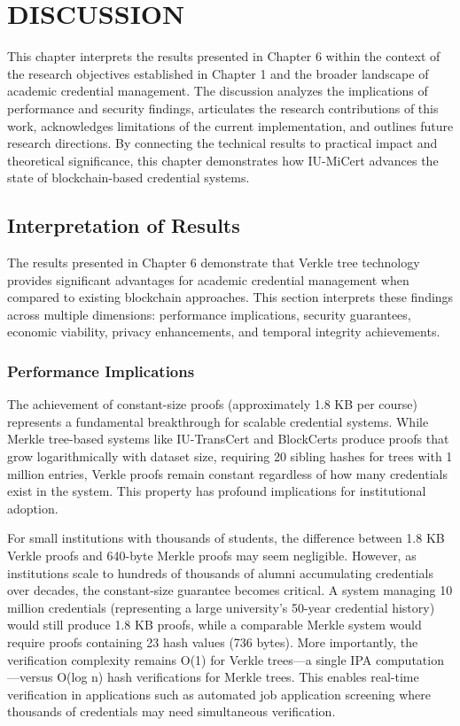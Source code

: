 \chapter{DISCUSSION}
\label{ch:discussion}

This chapter interprets the results presented in Chapter 6 within the context of the research objectives established in Chapter 1 and the broader landscape of academic credential management. The discussion analyzes the implications of performance and security findings, articulates the research contributions of this work, acknowledges limitations of the current implementation, and outlines future research directions. By connecting the technical results to practical impact and theoretical significance, this chapter demonstrates how IU-MiCert advances the state of blockchain-based credential systems.

\section{Interpretation of Results}
\label{sec:interpretation}

The results presented in Chapter 6 demonstrate that Verkle tree technology provides significant advantages for academic credential management when compared to existing blockchain approaches. This section interprets these findings across multiple dimensions: performance implications, security guarantees, economic viability, privacy enhancements, and temporal integrity achievements.

\subsection{Performance Implications}
\label{subsec:performance-implications}

The achievement of constant-size proofs (approximately 1.8 KB per course) represents a fundamental breakthrough for scalable credential systems. While Merkle tree-based systems like IU-TransCert \cite{le_iutranscert} and BlockCerts \cite{blockcerts_mit} produce proofs that grow logarithmically with dataset size, requiring 20 sibling hashes for trees with 1 million entries, Verkle proofs remain constant regardless of how many credentials exist in the system. This property has profound implications for institutional adoption.

For small institutions with thousands of students, the difference between 1.8 KB Verkle proofs and 640-byte Merkle proofs may seem negligible. However, as institutions scale to hundreds of thousands of alumni accumulating credentials over decades, the constant-size guarantee becomes critical. A system managing 10 million credentials (representing a large university's 50-year credential history) would still produce 1.8 KB proofs, while a comparable Merkle system would require proofs containing 23 hash values (736 bytes). More importantly, the verification complexity remains O(1) for Verkle trees—a single IPA computation—versus O(log n) hash verifications for Merkle trees. This enables real-time verification in applications such as automated job application screening where thousands of credentials may need simultaneous verification.

